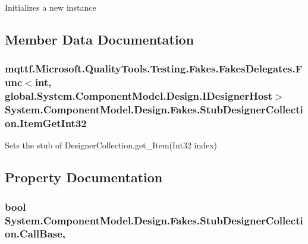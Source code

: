 Initializes a new instance



\subsection{Member Data Documentation}
\hypertarget{class_system_1_1_component_model_1_1_design_1_1_fakes_1_1_stub_designer_collection_a2171cb28cb3e5bc3b02cfda46d135ac9}{
\subsubsection[{Item\-Get\-Int32}]{\setlength{\rightskip}{0pt plus 5cm}mqttf.\-Microsoft.\-Quality\-Tools.\-Testing.\-Fakes.\-Fakes\-Delegates.\-Func$<$int, global.\-System.\-Component\-Model.\-Design.\-I\-Designer\-Host$>$ System.\-Component\-Model.\-Design.\-Fakes.\-Stub\-Designer\-Collection.\-Item\-Get\-Int32}}\label{class_system_1_1_component_model_1_1_design_1_1_fakes_1_1_stub_designer_collection_a2171cb28cb3e5bc3b02cfda46d135ac9}


Sets the stub of Designer\-Collection.\-get\-\_\-\-Item(\-Int32 index)



\subsection{Property Documentation}
\hypertarget{class_system_1_1_component_model_1_1_design_1_1_fakes_1_1_stub_designer_collection_a4990a2c7ed40674da7371fa581ddd994}{
\subsubsection[{Call\-Base}]{\setlength{\rightskip}{0pt plus 5cm}bool System.\-Component\-Model.\-Design.\-Fakes.\-Stub\-Designer\-Collection.\-Call\-Base\hspace{0.3cm}{\ttfamily [get]}, {\ttfamily [set]}}}\label{class_system_1_1_component_model_1_1_design_1_1_fakes_1_1_stub_designer_collection_a4990a2c7ed40674da7371fa581ddd994}


